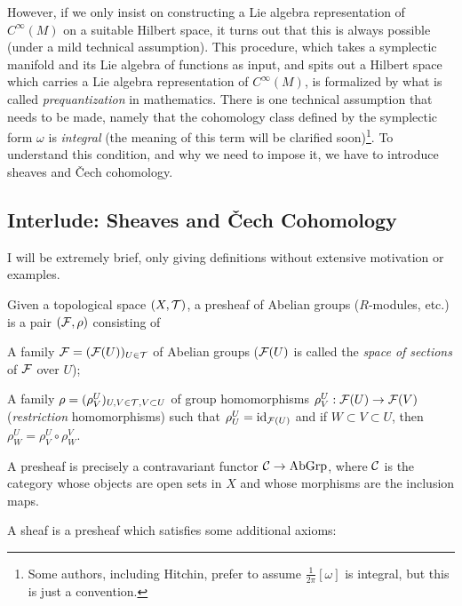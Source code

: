 \documentclass[parskip=half]{scrartcl}
\begin{document}
However, if we only insist on constructing a Lie algebra representation of $C^\infty(M)$ on a suitable Hilbert space, it turns out that this is always possible (under a mild technical assumption). This procedure, which takes a symplectic manifold and its Lie algebra of functions as input, and spits out a Hilbert space which carries a Lie algebra representation of $C^\infty(M)$, is formalized by what is called \emph{prequantization} in mathematics. There is one technical assumption that needs to be made, namely that the cohomology class defined by the symplectic form $\omega$ is \emph{integral} (the meaning of this term will be clarified soon)\footnote{Some authors, including Hitchin, prefer to assume $\frac{1}{2\pi}[\omega]$ is integral, but this is just a convention.}. To understand this condition, and why we need to impose it, we have to introduce sheaves and \v{C}ech cohomology.

\subsection{Interlude: Sheaves and \v{C}ech Cohomology}

I will be extremely brief, only giving definitions without extensive motivation or examples.

\begin{mydef}
	Given a topological space $(X,\mathcal{T})$, a presheaf of Abelian groups ($R$-modules, etc.) is a pair $(\mathcal{F},\rho)$ consisting of
	\begin{numberedlist}
		\item A family $\mathcal{F}=(\mathcal{F}(U))_{U\in \mathcal{T}}$ of Abelian groups ($\mathcal{F}(U)$ is called the \emph{space of sections} of $\mathcal{F}$ over $U$);
		\item A family $\rho=(\rho^U_V)_{U,V\in \mathcal{T},V\subset U}$ of group homomorphisms $\rho^U_V:\mathcal{F}(U)\to \mathcal{F}(V)$ (\emph{restriction} homomorphisms) such that $\rho^U_U=\operatorname{id}_{\mathcal{F}(U)}$ and if $W\subset V\subset U$, then $\rho^U_W=\rho^U_V\circ\rho^V_W$.
	\end{numberedlist}
\end{mydef}

\begin{rem}
	A presheaf is precisely a contravariant functor $\mathcal{C}\to \operatorname{AbGrp}$, where $\mathcal{C}$ is the category whose objects are open sets in $X$ and whose morphisms are the inclusion maps.
\end{rem}

A sheaf is a presheaf which satisfies some additional axioms:
\end{document}
